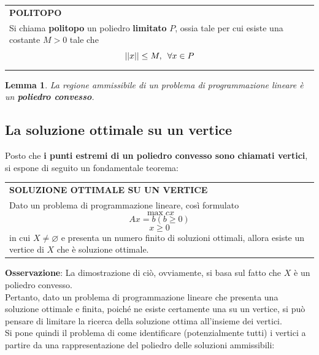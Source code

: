 \documentclass[a4paper]{extarticle}
\newtheorem{lemma}[theorem]{Lemma}
\renewcommand\arraystretch{}
\begin{document}
\vspace{2em}
\setlength{\tabcolsep}{14pt}
\renewcommand{\arraystretch}{2}
\noindent
\begin{tabularx}{\textwidth}{@{}|P|@{}}
    \hline
    {\textbf{POLITOPO}}\\
    \parbox{\linewidth}{Si chiama \textbf{politopo} un poliedro \textbf{limitato} $P$, ossia tale per cui esiste una costante $M>0$ tale che
    \[\left \vert \left \vert x \right \vert \right \vert \leq M, \hspace{0.5em} \forall x \in P\]
    \vspace{-1mm}}\\
    \hline
\end{tabularx}

\vspace{2em}
\begin{lemma}
    La regione ammissibile di un problema di programmazione lineare è un \textbf{poliedro convesso}.
\end{lemma}

\vspace{1em}
\subsection{La soluzione ottimale su un vertice}
Posto che \textbf{i punti estremi di un poliedro convesso sono chiamati vertici}, si espone di seguito un fondamentale teorema:

\vspace{2em}
\setlength{\tabcolsep}{14pt}
\renewcommand{\arraystretch}{2}
\noindent
\begin{tabularx}{\textwidth}{@{}|P|@{}}
    \hline
    {\textbf{SOLUZIONE OTTIMALE SU UN VERTICE}}\\
    \parbox{\linewidth}{Dato un problema di programmazione lineare, così formulato
    \[\max cx\]
    \[Ax = b (b \geq 0)\]
    \[x \geq 0\]
    in cui $X \neq \varnothing$ e presenta un numero finito di soluzioni ottimali, allora esiste un vertice di $X$ che è soluzione ottimale.
    \vspace{3mm}}\\
    \hline
\end{tabularx}

\vspace{1em}
\noindent
\textbf{Osservazione}: La dimostrazione di ciò, ovviamente, si basa sul fatto che $X$ è un poliedro convesso.\\
Pertanto, dato un problema di programmazione lineare che presenta una soluzione ottimale e finita, poiché ne esiste certamente una su un vertice, si può pensare di limitare la ricerca della soluzione ottima all'insieme dei vertici.\\
Si pone quindi il problema di come identificare (potenzialmente tutti) i vertici a partire da una rappresentazione del poliedro delle soluzioni ammissibili:
\end{document}

